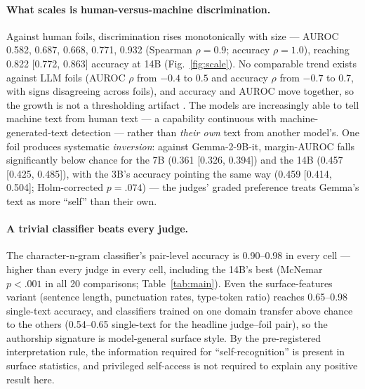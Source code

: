 \documentclass[11pt]{article}
\begin{document}
\paragraph{What scales is human-versus-machine discrimination.}
Against human foils, discrimination rises monotonically with size ---
AUROC 0.582, 0.687, 0.668, 0.771, 0.932 (Spearman $\rho = 0.9$; accuracy
$\rho = 1.0$), reaching 0.822 [0.772, 0.863] accuracy at 14B
(Fig.~\ref{fig:scale}). No comparable trend exists against LLM foils
(AUROC $\rho$ from $-0.4$ to $0.5$ and accuracy $\rho$ from $-0.7$ to
$0.7$, with signs disagreeing across foils), and accuracy and AUROC move
together, so the growth is not a thresholding artifact
\citep{schaeffer2023emergent}. The models are increasingly able to tell
machine text from human text --- a capability continuous with
machine-generated-text detection \citep{mitchell2023detectgpt} --- rather
than \emph{their own} text from another model's. One foil produces
systematic \emph{inversion}: against Gemma-2-9B-it, margin-AUROC falls
significantly below chance for the 7B (0.361 [0.326, 0.394]) and the 14B
(0.457 [0.425, 0.485]), with the 3B's accuracy pointing the same way
(0.459 [0.414, 0.504]; Holm-corrected $p = .074$) --- the judges' graded
preference treats Gemma's text as more ``self'' than their own.

\paragraph{A trivial classifier beats every judge.}
The character-n-gram classifier's pair-level accuracy is 0.90--0.98 in
every cell --- higher than every judge in every cell, including the 14B's
best (McNemar $p < .001$ in all 20 comparisons; Table~\ref{tab:main}).
Even the surface-features variant (sentence length, punctuation rates,
type-token ratio) reaches 0.65--0.98 single-text accuracy, and classifiers
trained on one domain transfer above chance to the others (0.54--0.65
single-text for the headline judge--foil pair), so the authorship
signature is model-general surface style. By the
pre-registered interpretation rule, the information required for
``self-recognition'' is present in surface statistics, and privileged
self-access is not required to explain any positive result here.
\end{document}
